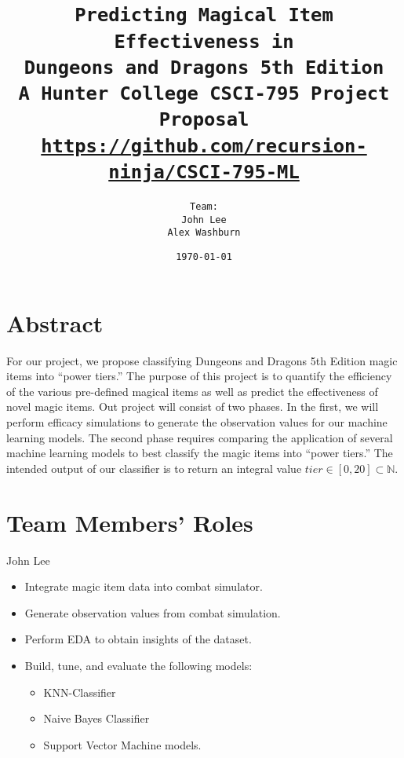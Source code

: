 \documentclass[12pt]{diazessay}
\title{\texttt{\LARGE{Predicting Magical Item Effectiveness in \\Dungeons and Dragons 5th Edition} \\\vspace{-0.35cm} {\large A Hunter College CSCI-795 Project Proposal}\\\normalsize\url{https://github.com/recursion-ninja/CSCI-795-ML}}} %
\author{\texttt{{\Huge Team:}\\\vspace*{-0.5em}
		John Lee \\\vspace*{-0.5em}
		Alex Washburn}} %
\date{\texttt{\today}} %
\begin{document}
\maketitle %

\vspace{-1cm}
\section*{Abstract}


For our project, we propose classifying Dungeons and Dragons 5th Edition magic items into ``power tiers.''
The purpose of this project is to quantify the efficiency of the various pre-defined magical items as well as predict the effectiveness of novel magic items.
Out project will consist of two phases.
In the first, we will perform efficacy simulations to generate the observation values for our machine learning models.
The second phase requires comparing the application of several machine learning models to best classify the magic items into ``power tiers.''
The intended output of our classifier is to return an integral value $tier \in [0, 20] \subset \mathbb{N}$.

\section*{Team Members' Roles}

John Lee

\begin{itemize}

	\item Integrate magic item data into combat simulator.
	\item Generate observation values from combat simulation.
	\item Perform EDA to obtain insights of the dataset.
	\item Build, tune, and evaluate the following models:
	\begin{itemize}
		\item KNN-Classifier
		\item Naive Bayes Classifier
		\item Support Vector Machine models.
	\end{itemize}

\end{itemize}
\end{document}
